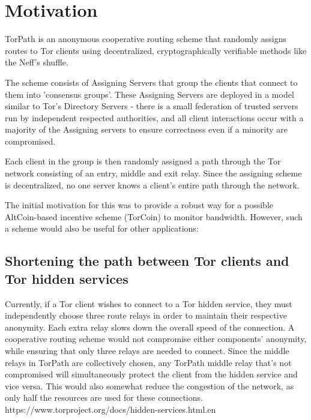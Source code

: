 \section{Motivation} \label{motivation}

TorPath is an anonymous cooperative routing scheme that randomly assigns routes to Tor clients using decentralized, cryptographically verifiable methods like the Neff's shuffle.

The scheme consists of Assigning Servers that group the clients that connect to them into 'consensus groups'. These Assigning Servers are deployed in a model similar to Tor's Directory Servers - there is a small federation of trusted servers run by independent respected authorities, and all client interactions occur with a majority of the Assigning servers to ensure correctness even if a minority are compromised. 

Each client in the group is then randomly assigned a path through the Tor network consisting of an entry, middle and exit relay. Since the assigning scheme is decentralized, no one server knows a client's entire path through the network.

The initial motivation for this was to provide a robust way for a possible AltCoin-based incentive scheme (TorCoin) to monitor bandwidth. However, such a scheme would also be useful for other applications:

\subsection{Shortening the path between Tor clients and Tor hidden services} 
Currently, if a Tor client wishes to connect to a Tor hidden service, they must independently choose three route relays in order to maintain their respective anonymity. Each extra relay slows down the overall speed of the connection. A cooperative routing scheme would not compromise either components' anonymity, while ensuring that only three relays are needed to connect. Since the middle relays in TorPath are collectively chosen, any TorPath middle relay that's not compromised will simultaneously protect the client from the hidden service and vice versa. This would also somewhat reduce the congestion of the network, as only half the resources are used for these connections. https://www.torproject.org/docs/hidden-services.html.en


